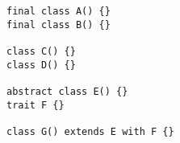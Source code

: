 \begin{lstlisting}[style=scalaioScala]
final class A() {}
final class B() {}

class C() {}
class D() {}

abstract class E() {}
trait F {}

class G() extends E with F {}
\end{lstlisting}
